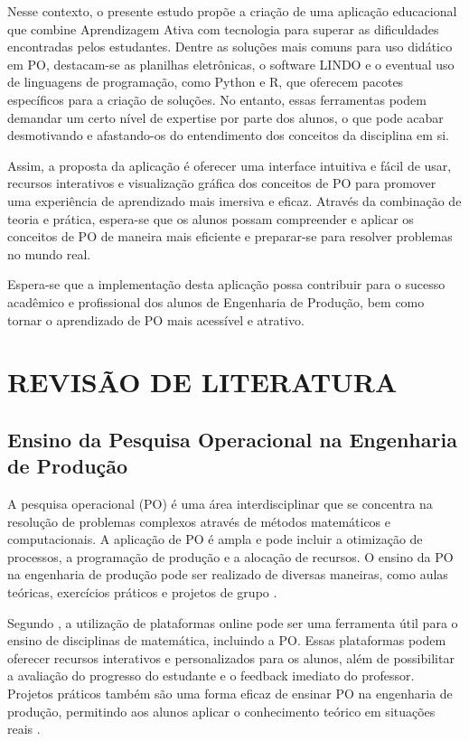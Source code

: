 \documentclass{article}
\begin{document}
Nesse contexto, o presente estudo propõe a criação de uma aplicação educacional que combine Aprendizagem Ativa com tecnologia para superar as dificuldades encontradas pelos estudantes. Dentre as soluções mais comuns para uso didático em PO, destacam-se as planilhas eletrônicas, o software LINDO e o eventual uso de linguagens de programação, como Python e R, que oferecem pacotes específicos para a criação de soluções. No entanto, essas ferramentas podem demandar um certo nível de expertise por parte dos alunos, o que pode acabar desmotivando e afastando-os do entendimento dos conceitos da disciplina em si.

Assim, a proposta da aplicação é oferecer uma interface intuitiva e fácil de usar, recursos interativos e visualização gráfica dos conceitos de PO para promover uma experiência de aprendizado mais imersiva e eficaz. Através da combinação de teoria e prática, espera-se que os alunos possam compreender e aplicar os conceitos de PO de maneira mais eficiente e preparar-se para resolver problemas no mundo real.

Espera-se que a implementação desta aplicação possa contribuir para o sucesso acadêmico e profissional dos alunos de Engenharia de Produção, bem como tornar o aprendizado de PO mais acessível e atrativo.


\section{REVISÃO DE LITERATURA}

\subsection{Ensino da Pesquisa Operacional na Engenharia de Produção}
A pesquisa operacional (PO) é uma área interdisciplinar que se concentra na resolução de problemas complexos através de métodos matemáticos e computacionais. A aplicação de PO é ampla e pode incluir a otimização de processos, a programação de produção e a alocação de recursos. O ensino da PO na engenharia de produção pode ser realizado de diversas maneiras, como aulas teóricas, exercícios práticos e projetos de grupo \cite{lima2016}.

Segundo , a utilização de plataformas online pode ser uma ferramenta útil para o ensino de disciplinas de matemática, incluindo a PO. Essas plataformas podem oferecer recursos interativos e personalizados para os alunos, além de possibilitar a avaliação do progresso do estudante e o feedback imediato do professor. Projetos práticos também são uma forma eficaz de ensinar PO na engenharia de produção, permitindo aos alunos aplicar o conhecimento teórico em situações reais \cite{lima2016}.
\end{document}
